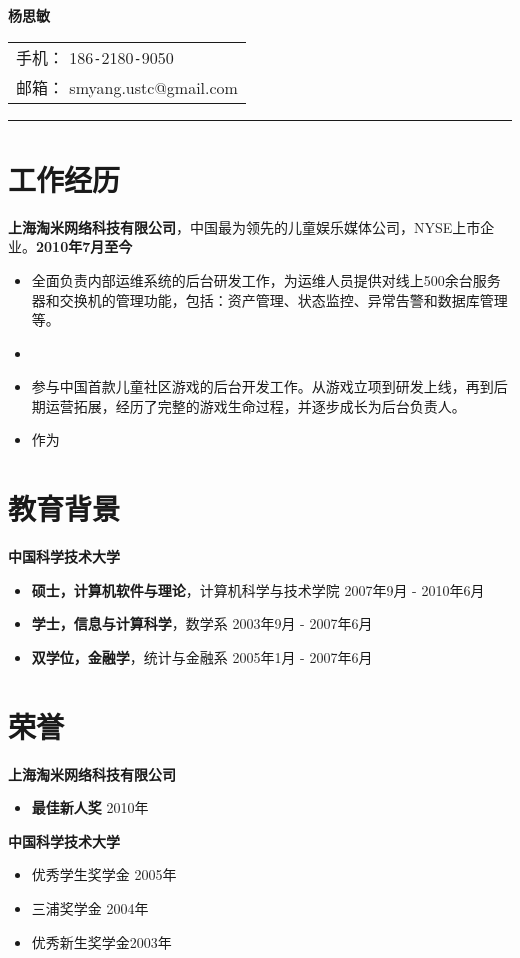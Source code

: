 \documentclass[margin]{res}
\newcommand{\ustc}{中国科学技术大学}
\newcommand{\taomee}{上海淘米网络科技有限公司}
\begin{document}
{\bfseries \huge 杨思敏}
\hfill
\begin{tabular}{l}
    手机： 186\texttt{-}2180\texttt{-}9050\\
    邮箱： {smyang.ustc@gmail.com}
\end{tabular}
\rule{\columnwidth}{1pt}

\section{工作经历}
{\bf \taomee}，中国最为领先的儿童娱乐媒体公司，NYSE上市企业。\hfill {\bf 2010年7月至今}\\[1mm]
\begin{itemize}
    \item 全面负责内部运维系统的后台研发工作，为运维人员提供对线上500余台服务器和交换机的管理功能，包括：资产管理、状态监控、异常告警和数据库管理等。
    \item 
    \item 参与中国首款儿童社区游戏的后台开发工作。从游戏立项到研发上线，再到后期运营拓展，经历了完整的游戏生命过程，并逐步成长为后台负责人。
    \item 作为

\end{itemize}

\section{教育背景}
{\bf \ustc}\\[1mm]
\begin{itemize}
    \item {\bf 硕士，计算机软件与理论}，计算机科学与技术学院 \hfill 2007年9月 - 2010年6月
    \item {\bf 学士，信息与计算科学}，数学系 \hfill 2003年9月 - 2007年6月
    \item {\bf 双学位，金融学}，统计与金融系 \hfill 2005年1月 - 2007年6月
\end{itemize}


\section{荣誉} 
{\bf \taomee}\\
\begin{itemize}
    \item {\bf 最佳新人奖} \hfill 2010年
\end{itemize}
{\bf \ustc}\\
\begin{itemize}
    \item 优秀学生奖学金 \hfill 2005年
    \item 三浦奖学金 \hfill 2004年
    \item 优秀新生奖学金\hfill 2003年
\end{itemize}
\end{document}
